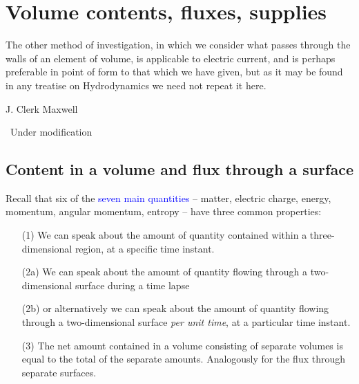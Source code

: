 \documentclass[a4paper,12pt,%
onecolumn,oneside,%
british%
]{memoir}
\newcommand{\mynotew}[1]{{\footnotesize\color{midgrey}\faIcon{tools}\ #1}}
\renewcommand*{\|}[1][]{\nonscript\:#1\vert\nonscript\:\mathopen{}}
\newcommand*{\sect}{\S}%
\renewcommand*{\autoref}[2]{\sidepar{\vspace{-1ex}\footnotesize{\color{blue}\faIcon{%
angle-right%
}\enspace\sect~\ref{#1} page~\pageref{#1}}}\textcolor{blue}{#2}}
\begin{document}
\printpagenotes*
\clearpage
\chapter{Volume contents, fluxes, supplies}
\label{cha:contents_fluxes}


\epigraph{The other method of investigation, in which we consider what passes through the walls of an element of volume, is applicable to electric current, and is perhaps preferable in point of form to that which we have given, but as it may be found in any treatise on Hydrodynamics we need not repeat it here.%
}{J. Clerk Maxwell \cites*{maxwell1873}}


\mynotew{Under modification}

\section{Content in a volume and flux through a surface}
\label{sec:contentflux}

Recall that six of the \autoref{cha:stuff}{seven main quantities} -- matter, electric charge, energy, momentum, angular momentum, entropy -- have three common properties:
\begin{enumerate}
\item[(1)] We can speak about the amount of quantity contained within a three-dimensional region, at a specific time instant.
\item[(2a)] We can speak about the amount of quantity flowing through a two-dimensional surface during a time lapse\textellipsis
\item[(2b)] \textellipsis or alternatively we can speak about the amount of quantity flowing through a two-dimensional surface \emph{per unit time}, at a particular time instant.
\item[(3)]\label{item:extensivity}The net amount contained in a volume consisting of separate volumes is equal to the total of the separate amounts. Analogously for the flux through separate surfaces.
\end{enumerate}
\end{document}
